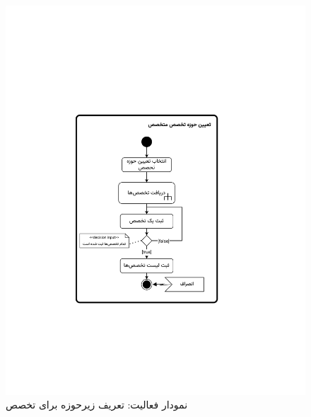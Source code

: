 \begin{figure}[ht!]
	\centering
	\includegraphics[scale=0.8, page=3]{figs/OOD-activity21-30.pdf}
	\caption{نمودار فعالیت: تعریف زیرحوزه برای تخصص}
\end{figure}
\FloatBarrier
\newpage

